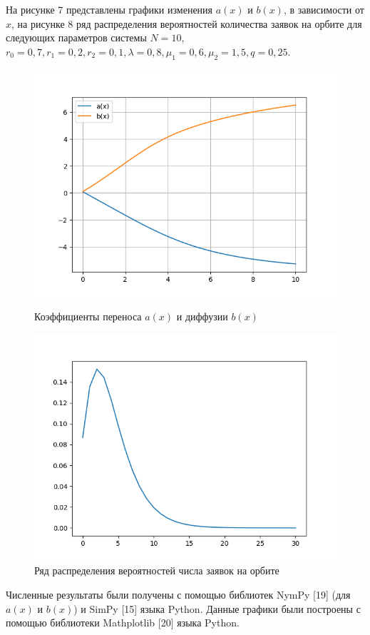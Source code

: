 На рисунке 7 представлены графики изменения $a(x)$ и $b(x)$, в зависимости от $x$, на рисунке 8 ряд распределения вероятностей количества заявок на орбите для следующих параметров системы $N=10$, $r_{0}=0,7, r_{1}=0,2, r_{2}=0,1, \lambda=0,8, \mu_{1}=0,6, \mu_{2}=1,5, q=0,25.$
\begin{figure}[H]
	\centering
	\begin{minipage}[h]{0.49\linewidth}
		\includegraphics[width=0.8\linewidth]{ab10} 	
		\caption{Коэффициенты переноса $a(x)$ и диффузии $b(x)$}
		\label{ris:experimoriginal}
	\end{minipage}
	\hfill
	\begin{minipage}[h]{0.49\linewidth}
		\includegraphics[width=0.8\linewidth]{P10} 
		\caption{Ряд распределения вероятностей числа заявок на орбите}
		\label{ris:experimcoded}
	\end{minipage}
\end{figure}

Численные результаты были получены с помощью библиотек NymPy [19] (для $a(x)$ и $b(x)$) и SimPy [15] языка Python.
Данные графики были построены с помощью библиотеки Mathplotlib [20] языка Python.